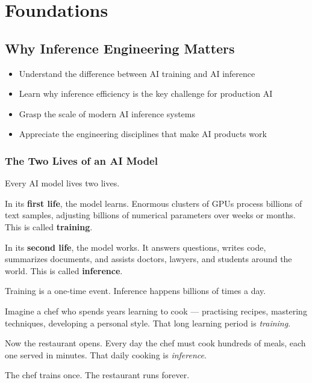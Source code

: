 \documentclass[10pt, oneside, openany]{book}
\newcommand{\analogybox}[2]{\begin{tcolorbox}[analogystyle, title={Analogy: #1}]#2\end{tcolorbox}}
\newenvironment{learningobjectives}
  {\begin{tcolorbox}[enhanced, breakable,
    colback={rgb,255:red,232;green,240;blue,255},
    colframe=NavyBlue, boxrule=1.5pt, arc=4pt,
    title={\bfseries Learning Objectives},
    fonttitle=\bfseries\color{white},
    attach boxed title to top left={yshift=-2mm, xshift=5mm},
    boxed title style={colback=NavyBlue, arc=2pt}]
  \begin{itemize}[leftmargin=1.5em, itemsep=2pt]}
  {\end{itemize}\end{tcolorbox}}
\newcommand{\keyterm}[1]{\textbf{\color{AccentOrange}#1}}
\begin{document}
\clearpage

\part{Foundations}

\chapter{Why Inference Engineering Matters}
\label{ch:why}

\begin{learningobjectives}
  \item Understand the difference between AI training and AI inference
  \item Learn why inference efficiency is the key challenge for production AI
  \item Grasp the scale of modern AI inference systems
  \item Appreciate the engineering disciplines that make AI products work
\end{learningobjectives}

\section{The Two Lives of an AI Model}

Every AI model lives two lives.

In its \textbf{first life}, the model learns.  Enormous clusters of GPUs process
billions of text samples, adjusting billions of numerical parameters over weeks or
months.  This is called \keyterm{training}.

In its \textbf{second life}, the model works.  It answers questions, writes code,
summarizes documents, and assists doctors, lawyers, and students around the world.
This is called \keyterm{inference}.

Training is a one-time event.  Inference happens billions of times a day.

\analogybox{The Chef and the Restaurant}{
Imagine a chef who spends years learning to cook --- practising recipes, mastering
techniques, developing a personal style.  That long learning period is
\textit{training}.

Now the restaurant opens.  Every day the chef must cook hundreds of meals, each one
served in minutes.  That daily cooking is \textit{inference}.

The chef trains once.  The restaurant runs forever.
}
\end{document}
